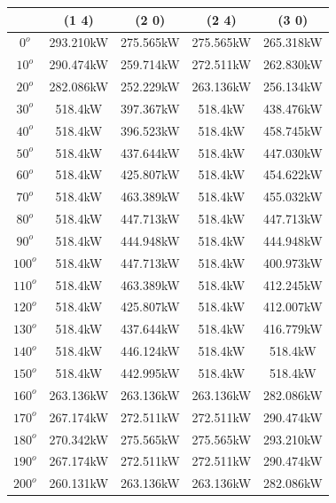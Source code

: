         \begin{table}[H]
        	\centering
        	\begin{tabular}{|c|c|c|c|c|} \hline
        			& (1 4)		& (2 0)		& (2 4)		& (3 0)		\\ \hline
        		$0^o$	& 293.210kW	& 275.565kW	& 275.565kW	& 265.318kW	\\ \hline
        		$10^o$	& 290.474kW	& 259.714kW	& 272.511kW	& 262.830kW	\\ \hline
        		$20^o$	& 282.086kW	& 252.229kW	& 263.136kW	& 256.134kW	\\ \hline
        		$30^o$	& 518.4kW	& 397.367kW	& 518.4kW	& 438.476kW	\\ \hline
        		$40^o$	& 518.4kW	& 396.523kW	& 518.4kW	& 458.745kW	\\ \hline
        		$50^o$	& 518.4kW	& 437.644kW	& 518.4kW	& 447.030kW	\\ \hline
        		$60^o$	& 518.4kW	& 425.807kW	& 518.4kW	& 454.622kW	\\ \hline
        		$70^o$	& 518.4kW	& 463.389kW	& 518.4kW	& 455.032kW	\\ \hline
        		$80^o$	& 518.4kW	& 447.713kW	& 518.4kW	& 447.713kW	\\ \hline
        		$90^o$	& 518.4kW	& 444.948kW	& 518.4kW	& 444.948kW	\\ \hline
        		$100^o$	& 518.4kW	& 447.713kW	& 518.4kW	& 400.973kW	\\ \hline
        		$110^o$	& 518.4kW	& 463.389kW	& 518.4kW	& 412.245kW	\\ \hline
        		$120^o$	& 518.4kW	& 425.807kW	& 518.4kW	& 412.007kW	\\ \hline
        		$130^o$	& 518.4kW	& 437.644kW	& 518.4kW	& 416.779kW	\\ \hline
        		$140^o$	& 518.4kW	& 446.124kW	& 518.4kW	& 518.4kW	\\ \hline
        		$150^o$	& 518.4kW	& 442.995kW	& 518.4kW	& 518.4kW	\\ \hline
        		$160^o$	& 263.136kW	& 263.136kW	& 263.136kW	& 282.086kW	\\ \hline
        		$170^o$	& 267.174kW	& 272.511kW	& 272.511kW	& 290.474kW	\\ \hline
        		$180^o$	& 270.342kW	& 275.565kW	& 275.565kW	& 293.210kW	\\ \hline
        		$190^o$	& 267.174kW	& 272.511kW	& 272.511kW	& 290.474kW	\\ \hline
        		$200^o$	& 260.131kW	& 263.136kW	& 263.136kW	& 282.086kW	\\ \hline

\end{tabular}
\end{table}
